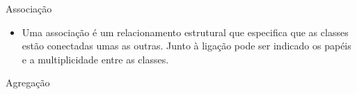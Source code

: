 \begin{frame}{Associação}\small

  \begin{itemize}
  \item Uma \alert{associação} é um relacionamento estrutural que especifica que as classes
    estão conectadas umas as outras. Junto à ligação pode ser indicado os \alert{papéis} e a
    \alert{multiplicidade} entre as classes.
  \end{itemize}\bigskip



\end{frame}


\begin{frame}{Agregação}
  

\end{frame}


